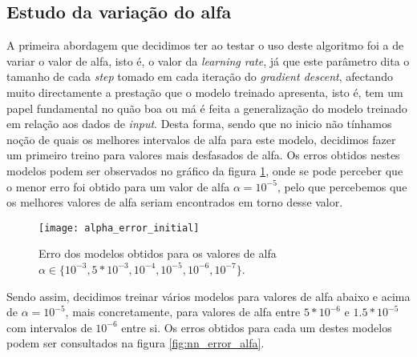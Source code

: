 \subsection{Estudo da variação do alfa}
A primeira abordagem que decidimos ter ao testar o uso deste algoritmo foi a de variar o valor de alfa, isto é, o valor da \textit{learning rate}, já que este parâmetro dita o tamanho de cada \textit{step} tomado em cada iteração do \textit{gradient descent}, afectando muito directamente a prestação que o modelo treinado apresenta, isto é, tem um papel fundamental no quão boa ou má é feita a generalização do modelo treinado em relação aos dados de \textit{input}.
Desta forma, sendo que no inicio não tínhamos noção de quais os melhores intervalos de alfa para este modelo, decidimos fazer um primeiro treino para valores mais desfasados de alfa. Os erros obtidos nestes modelos podem ser observados no gráfico da figura \ref{fig:nn_initial_error_alfa}, onde se pode perceber que o menor erro foi obtido para um valor de alfa $\alpha = 10^{-5}$, pelo que percebemos que os melhores valores de alfa seriam encontrados em torno desse valor.

\begin{figure}[!t]
\centering
\texttt{[image: alpha\_error\_initial]}
\caption{Erro dos modelos obtidos para os valores de alfa $\alpha \in \{10^{-3}, 5*10^{-3}, 10^{-4}, 10^{-5}, 10^{-6}, 10^{-7}\}$.}
\label{fig:nn_initial_error_alfa}
\end{figure}
Sendo assim, decidimos treinar vários modelos para valores de alfa abaixo e acima de $\alpha = 10^{-5}$, mais concretamente, para valores de alfa entre $5*10^{-6}$ e $1.5*10^{-5}$ com intervalos de $10^{-6}$ entre si. Os erros  obtidos para cada um destes modelos podem ser consultados na figura \ref{fig:nn_error_alfa}.

